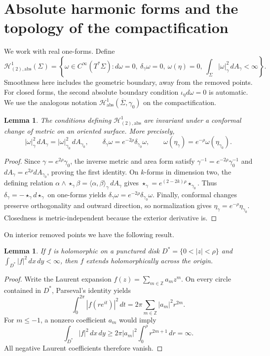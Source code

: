 \documentclass[11pt]{amsart}
\numberwithin{equation}{section}
\newtheorem{lemma}[theorem]{Lemma}
\theoremstyle{definition}
\theoremstyle{remark}
\newcommand{\HH}{\mathcal H}
\newcommand{\Sigmabar}{\overline\Sigma}
\newcommand{\dd}{\,d}
\begin{document}
\section{Absolute harmonic forms and the topology of the compactification}\label{sec:hodge}
We work with real one-forms. Define
\[
\HH^1_{(2),\mathrm{abs}}(\Sigma)=
\left\{\omega\in C^\infty(T^*\Sigma):
 d\omega=0,\ \delta_\gamma\omega=0,\ \omega(\eta)=0,
 \ \int_\Sigma|\omega|_\gamma^2\dd A_\gamma<\infty\right\}.
\]
Smoothness here includes the geometric boundary, away from the removed points. For closed forms, the second absolute boundary condition $\iota_\eta d\omega=0$ is automatic. We use the analogous notation $\HH^1_{\mathrm{abs}}(\Sigmabar,\gamma_0)$ on the compactification.

\begin{lemma}\label{lem:conformal}
The conditions defining $\HH^1_{(2),\mathrm{abs}}$ are invariant under a conformal change of metric on an oriented surface. More precisely,
\begin{equation}\label{eq:conformal-norm}
|\omega|_\gamma^2\dd A_\gamma
=|\omega|_{\gamma_0}^2\dd A_{\gamma_0},
\qquad
\delta_\gamma\omega=e^{-2\rho}\delta_{\gamma_0}\omega,
\qquad
\omega(\eta_\gamma)=e^{-\rho}\omega(\eta_{\gamma_0}).
\end{equation}
\end{lemma}
\begin{proof}
Since $\gamma=e^{2\rho}\gamma_0$, the inverse metric and area form satisfy
$\gamma^{-1}=e^{-2\rho}\gamma_0^{-1}$ and
$dA_\gamma=e^{2\rho}dA_{\gamma_0}$, proving the first identity.
On $k$-forms in dimension two, the defining relation
$\alpha\wedge\star_\gamma\beta
=\langle\alpha,\beta\rangle_\gamma\,dA_\gamma$ gives
$\star_\gamma=e^{(2-2k)\rho}\star_{\gamma_0}$.
Thus $\delta_\gamma=-\star_\gamma d\star_\gamma$ on one-forms
yields $\delta_\gamma\omega=e^{-2\rho}\delta_{\gamma_0}\omega$.
Finally, conformal changes preserve orthogonality and outward direction,
so normalization gives $\eta_\gamma=e^{-\rho}\eta_{\gamma_0}$.
Closedness is metric-independent because the exterior derivative is.
\end{proof}

On interior removed points we have the following result.
\begin{lemma}\label{lem:holomorphic-removal}
If $f$ is holomorphic on a punctured disk $D^*=\{0<|z|<\rho\}$ and
$\int_{D^*}|f|^2\dd x\dd y<\infty$, then $f$ extends holomorphically across the origin.
\end{lemma}
\begin{proof}
Write the Laurent expansion $f(z)=\sum_{m\in\mathbb Z}a_mz^m$. On every circle contained in $D^*$, Parseval's identity yields
\[
\int_0^{2\pi}|f(re^{it})|^2\dd t
=2\pi\sum_{m\in\mathbb Z}|a_m|^2r^{2m}.
\]
For $m\le-1$, a nonzero coefficient $a_m$ would imply
\[
\int_{D^*}|f|^2\dd x\dd y
\ge 2\pi|a_m|^2\int_0^\rho r^{2m+1}\dd r=\infty.
\]
All negative Laurent coefficients therefore vanish.
\end{proof}
\end{document}
